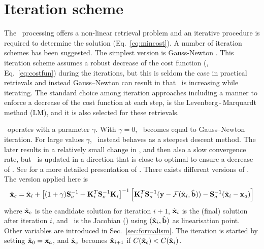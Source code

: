 \section{Iteration scheme}
\label{sec:ml}
%
The \smr\ processing offers a non-linear retrieval problem and an iterative
procedure is required to determine the solution (Eq.~\ref{eq:mincost}). A
number of iteration schemes has been suggested. The simplest version is
Gauss-Newton \citep[see][Sec.~5.3]{rodgers:00}. This iteration scheme assumes a
robust decrease of the cost function (\CstFnc, Eq.~\ref{eq:costfun}) during the
iterations, but this is seldom the case in practical retrievals and instead
Gauss--Newton can result in that \CstFnc\ is increasing while iterating.
The standard choice among iteration approaches including a manner to enforce a
decrease of the cost function at each step, is the Levenberg\,-\,Marquardt
method (LM), and it is also selected for these retrievals.

\LM\ operates with a parameter $\gamma$. With $\gamma=0$, \LM\ becomes equal to
Gauss--Newton iteration. For large values $\gamma$, \LM\ instead behaves as a
steepest descent method. The later results in a relatively small change in
\SttVct, and then also a slow convergence rate, but \SttVct\ is updated in a
direction that is close to optimal to ensure a decrease of \CstFnc. See
\citet[][Sec.~5.7]{rodgers:00} for a more detailed presentation of \LM.
There exists different versions of \LM. The version applied here is
\citep[][Eq.~5.36]{rodgers:00}
\begin{equation}
  \label{eq:ml}
  \hat{\mathbf{x}}_c = \hat{\mathbf{x}}_i + 
  \left[ (1+\gamma)\mathbf{S}_{a}^{-1} + 
          \mathbf{K}_{i}^T\mathbf{S}_{o}^{-1}\mathbf{K}_{i} \right]^{-1}
  \left[ \mathbf{K}_{i}^T\mathbf{S}_{o}^{-1}(\mathbf{y}-\mathcal{F}(\hat{\mathbf{x}}_i,\hat{\mathbf{b}})) -
         \mathbf{S}_{a}^{-1}(\hat{\mathbf{x}}_i-\mathbf{x}_{a})\right]
\end{equation}
where $\hat{\mathbf{x}}_c$ is the candidate solution for iteration $i+1$, $\hat{\mathbf{x}}_i$ is
the (final) solution after iteration $i$, and \ is the Jacobian
(\aWfnMtr{\SttVct}) using $(\hat{\mathbf{x}}_i,\hat{\mathbf{b}})$ as linearisation point.
Other variables are introduced in Sec.~\ref{sec:formalism}. The iteration is
started by setting $\hat{\mathbf{x}}_0 = \mathbf{x}_{a}$, and $\hat{\mathbf{x}}_c$ becomes
$\hat{\mathbf{x}}_{i+1}$ if $C(\hat{\mathbf{x}}_c) < C(\hat{\mathbf{x}}_i)$.

